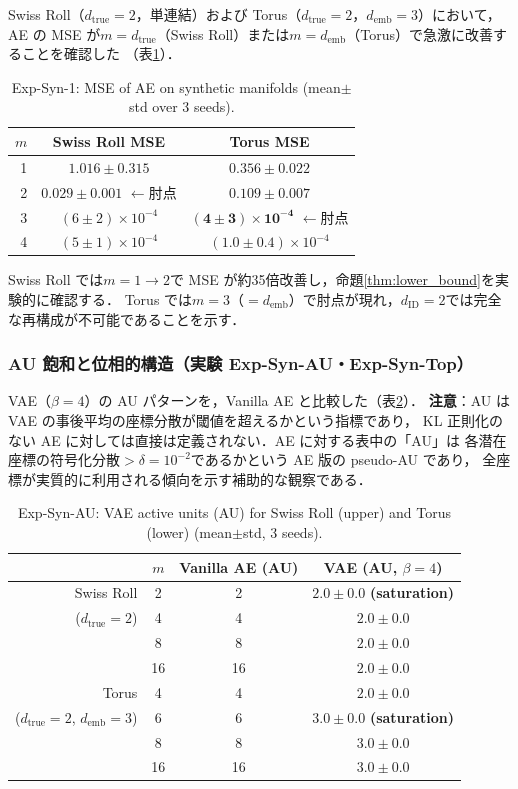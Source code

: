 \documentclass[11pt,a4paper]{jsarticle}
\newcommand{\dID}{d_{\mathrm{ID}}}
\newcommand{\dtrue}{d_{\mathrm{true}}}
\newcommand{\demb}{d_{\mathrm{emb}}}
\begin{document}
Swiss Roll（$\dtrue = 2$，単連結）および Torus（$\dtrue = 2$，$\demb = 3$）において，
AE の MSE が$m = \dtrue$（Swiss Roll）または$m = \demb$（Torus）で急激に改善することを確認した
（表\ref{tab:e1}）．

\begin{table}[H]
\centering
\caption{Exp-Syn-1: MSE of AE on synthetic manifolds (mean$\pm$std over 3 seeds).}
\label{tab:e1}
\small
\begin{tabular}{rcc}
\toprule
$m$ & Swiss Roll MSE & Torus MSE \\
\midrule
1 & $1.016\pm0.315$ & $0.356\pm0.022$ \\
2 & $\boldsymbol{0.029\pm0.001}$ $\leftarrow$肘点 & $0.109\pm0.007$ \\
3 & $(6\pm2)\times10^{-4}$ & $\boldsymbol{(4\pm3)\times10^{-4}}$ $\leftarrow$肘点 \\
4 & $(5\pm1)\times10^{-4}$ & $(1.0\pm0.4)\times10^{-4}$ \\
\bottomrule
\end{tabular}
\end{table}

Swiss Roll では$m = 1 \to 2$で MSE が約35倍改善し，命題\ref{thm:lower_bound}を実験的に確認する．
Torus では$m = 3$（$= \demb$）で肘点が現れ，$\dID = 2$では完全な再構成が不可能であることを示す．

\subsubsection{AU 飽和と位相的構造（実験 Exp-Syn-AU・Exp-Syn-Top）}

VAE（$\beta = 4$）の AU パターンを，Vanilla AE と比較した（表\ref{tab:ea_summary}）．
\textbf{注意}：AU は VAE の事後平均の座標分散が閾値を超えるかという指標であり，
KL 正則化のない AE に対しては直接は定義されない．AE に対する表中の「AU」は
各潜在座標の符号化分散$> \delta = 10^{-2}$であるかという AE 版の pseudo-AU であり，
全座標が実質的に利用される傾向を示す補助的な観察である．

\begin{table}[H]
\centering
\caption{Exp-Syn-AU: VAE active units (AU) for Swiss Roll (upper) and Torus (lower) (mean$\pm$std, 3 seeds).}
\label{tab:ea_summary}
\small
\begin{tabular}{rccc}
\toprule
 & $m$ & Vanilla AE (AU) & VAE (AU, $\beta=4$) \\
\midrule
Swiss Roll & 2 & 2 & $2.0\pm0.0$ \textbf{(saturation)} \\
($d_\mathrm{true}=2$) & 4 & 4 & $2.0\pm0.0$ \\
 & 8 & 8 & $2.0\pm0.0$ \\
 & 16 & 16 & $2.0\pm0.0$ \\
\midrule
Torus & 4 & 4 & $2.0\pm0.0$ \\
($d_\mathrm{true}=2$, $d_\mathrm{emb}=3$) & 6 & 6 & $3.0\pm0.0$ \textbf{(saturation)} \\
 & 8 & 8 & $3.0\pm0.0$ \\
 & 16 & 16 & $3.0\pm0.0$ \\
\bottomrule
\end{tabular}
\end{table}
\end{document}
